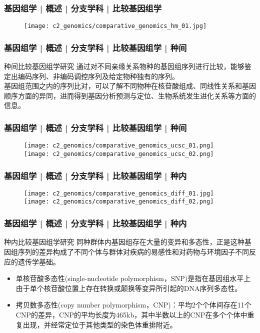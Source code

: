\begin{frame}
  \frametitle{基因组学 | 概述 | 分支学科 | 比较基因组学}
  \begin{figure}
    \centering
    \texttt{[image: c2\_genomics/comparative\_genomics\_hm\_01.jpg]}
  \end{figure}
\end{frame}

\begin{frame}
  \frametitle{基因组学 | 概述 | 分支学科 | 比较基因组学 | 种间}
  \begin{block}{种间比较基因组学研究}
通过对不同亲缘关系物种的基因组序列进行比较，能够鉴定出编码序列、非编码调控序列及给定物种独有的序列。\\
\vspace{1em}
基因组范围之内的序列比对，可以了解不同物种在核苷酸组成、同线性关系和基因顺序方面的异同，进而得到基因分析预测与定位、生物系统发生进化关系等方面的信息。
  \end{block}
\end{frame}

\begin{frame}
  \frametitle{基因组学 | 概述 | 分支学科 | 比较基因组学 | 种间}
  \begin{figure}
    \centering
    \texttt{[image: c2\_genomics/comparative\_genomics\_ucsc\_01.png]}\\
    \vspace{0.5em}
    \texttt{[image: c2\_genomics/comparative\_genomics\_ucsc\_02.png]}
  \end{figure}
\end{frame}

\begin{frame}
  \frametitle{基因组学 | 概述 | 分支学科 | 比较基因组学 | 种内}
  \begin{figure}
    \centering
    \texttt{[image: c2\_genomics/comparative\_genomics\_diff\_01.jpg]}
    \hspace{0.1em}
    \texttt{[image: c2\_genomics/comparative\_genomics\_diff\_02.png]}
  \end{figure}
\end{frame}

\begin{frame}
  \frametitle{基因组学 | 概述 | 分支学科 | 比较基因组学 | 种内}
  \begin{block}{种内比较基因组学研究}
同种群体内基因组存在大量的变异和多态性，正是这种基因组序列的差异构成了不同个体与群体对疾病的易感性和对药物与环境因子不同反应的遗传学基础。
\begin{itemize}
  \item 单核苷酸多态性(single-nucleotide polymorphism，SNP)是指在基因组水平上由于单个核苷酸位置上存在转换或颠换等变异所引起的DNA序列多态性。
  \item 拷贝数多态性(copy number polymorphism，CNP)：平均2个个体间存在11个CNP的差异，CNP的平均长度为465kb，其中半数以上的CNP在多个个体中重复出现，并经常定位于其他类型的染色体重排附近。
\end{itemize}
  \end{block}
\end{frame}

